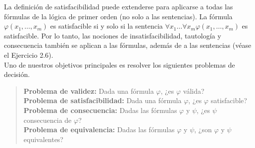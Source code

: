 \message{ !name(main.tex)}\documentclass[12pt,a4paper]{book}
\begin{document}
    La definición de satisfacibilidad puede extenderse para aplicarse a todas las fórmulas de la lógica de primer orden (no
    solo a las sentencias). La fórmula $\varphi(x_{1},\dots,x_{m})$ es satisfacible si y solo si la sentencia
    $\forall x_{1}\dots\forall x_{m}\varphi(x_{1},\dots,x_{m})$ es satisfacible. Por lo tanto, las nociones de
    insatisfacibilidad, tautología y consecuencia también se aplican a las fórmulas, además de a las sentencias (véase el
    Ejercicio 2.6).\\
    Uno de nuestros objetivos principales es resolver los siguientes problemas de decisión.

    \begin{quote}
        \textbf{Problema de validez:} Dada una fórmula $\varphi$, ¿es $\varphi$ válida?\\
        \textbf{Problema de satisfacibilidad:} Dada una fórmula $\varphi$, ¿es $\varphi$ satisfacible?\\
        \textbf{Problema de consecuencia:} Dadas las fórmulas $\varphi$ y $\psi$, ¿es $\psi$ consecuencia de $\varphi$?\\
        \textbf{Problema de equivalencia:} Dadas las fórmulas $\varphi$ y $\psi$, ¿son $\varphi$ y $\psi$ equivalentes?
    \end{quote}
\end{document}

